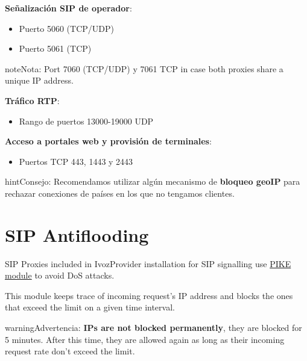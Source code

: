 \documentclass[letterpaper,10pt,spanish]{sphinxmanual}
\begin{document}
\textbf{Señalización SIP de operador}:
\begin{itemize}
\item {} 
Puerto 5060 (TCP/UDP)

\item {} 
Puerto 5061 (TCP)

\end{itemize}

\begin{notice}{note}{Nota:}
Port 7060 (TCP/UDP) y 7061 TCP in case both proxies share a unique IP address.
\end{notice}

\textbf{Tráfico RTP}:
\begin{itemize}
\item {} 
Rango de puertos 13000-19000 UDP

\end{itemize}

\textbf{Acceso a portales web y provisión de terminales}:
\begin{itemize}
\item {} 
Puertos TCP 443, 1443 y 2443

\end{itemize}

\begin{notice}{hint}{Consejo:}
Recomendamos utilizar algún mecanismo de \textbf{bloqueo geoIP} para rechazar conexiones de países en los que no tengamos clientes.
\end{notice}


\section{SIP Antiflooding}
\label{security_and_maintenance/security/antiflooding::doc}\label{security_and_maintenance/security/antiflooding:sip-antiflooding}\label{security_and_maintenance/security/antiflooding:id1}
SIP Proxies included in IvozProvider installation for SIP signalling use
\href{http://kamailio.org/docs/modules/5.1.x/modules/pike.html}{PIKE module} to avoid DoS attacks.

This module keeps trace of incoming request's IP address and blocks the ones that exceed the limit on a given time
interval.

\begin{notice}{warning}{Advertencia:}
\textbf{IPs are not blocked permanently}, they are blocked for 5 minutes. After this time, they are allowed again
as long as their incoming request rate don't exceed the limit.
\end{notice}
\end{document}
